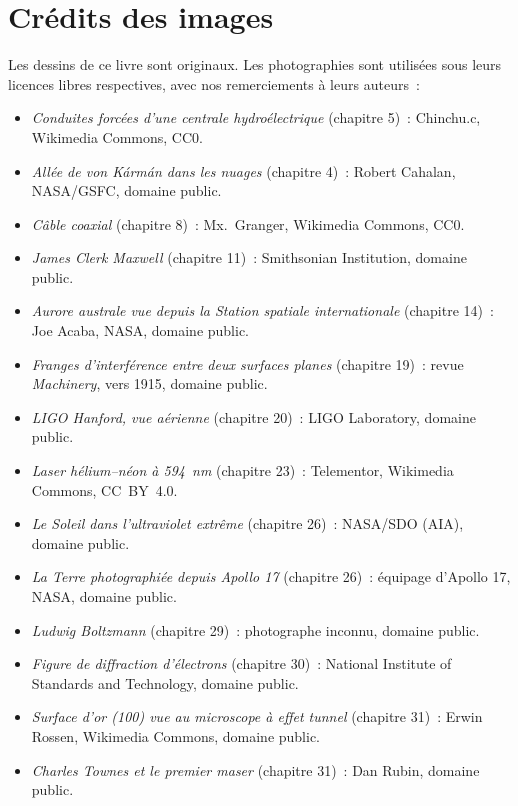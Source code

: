 \chapter*{Crédits des images}

Les dessins de ce livre sont originaux. Les photographies sont
utilisées sous leurs licences libres respectives, avec nos
remerciements à leurs auteurs~:

\begin{itemize}
  \item \emph{Conduites forcées d'une centrale hydroélectrique}
        (chapitre 5)~: Chinchu.c, Wikimedia Commons, CC0.
  \item \emph{Allée de von Kármán dans les nuages} (chapitre 4)~:
        Robert Cahalan, NASA/GSFC, domaine public.
  \item \emph{Câble coaxial} (chapitre 8)~: Mx.~Granger, Wikimedia
        Commons, CC0.
  \item \emph{James Clerk Maxwell} (chapitre 11)~: Smithsonian
        Institution, domaine public.
  \item \emph{Aurore australe vue depuis la Station spatiale
        internationale} (chapitre 14)~: Joe Acaba, NASA, domaine
        public.
  \item \emph{Franges d'interférence entre deux surfaces planes}
        (chapitre 19)~: revue \emph{Machinery}, vers 1915, domaine
        public.
  \item \emph{LIGO Hanford, vue aérienne} (chapitre 20)~: LIGO
        Laboratory, domaine public.
  \item \emph{Laser hélium--néon à 594~nm} (chapitre 23)~:
        Telementor, Wikimedia Commons, CC~BY~4.0.
  \item \emph{Le Soleil dans l'ultraviolet extrême} (chapitre 26)~:
        NASA/SDO (AIA), domaine public.
  \item \emph{La Terre photographiée depuis Apollo 17}
        (chapitre 26)~: équipage d'Apollo 17, NASA, domaine public.
  \item \emph{Ludwig Boltzmann} (chapitre 29)~: photographe inconnu,
        domaine public.
  \item \emph{Figure de diffraction d'électrons} (chapitre 30)~:
        National Institute of Standards and Technology, domaine
        public.
  \item \emph{Surface d'or (100) vue au microscope à effet tunnel}
        (chapitre 31)~: Erwin Rossen, Wikimedia Commons, domaine
        public.
  \item \emph{Charles Townes et le premier maser} (chapitre 31)~:
        Dan Rubin, domaine public.
\end{itemize}

